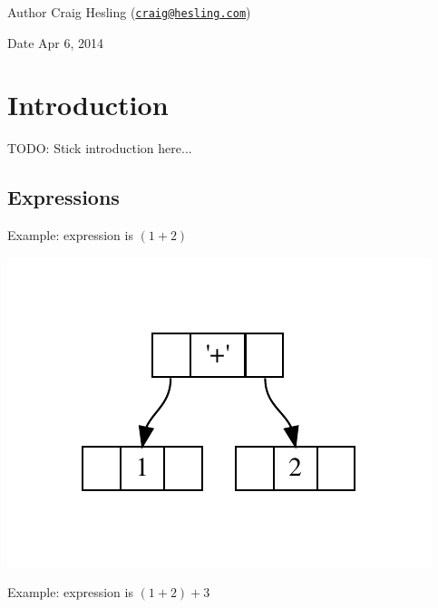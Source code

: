 \begin{DoxyAuthor}{Author}
Craig Hesling (\href{mailto:craig@hesling.com}{\tt craig@hesling.\+com}) 
\end{DoxyAuthor}
\begin{DoxyDate}{Date}
Apr 6, 2014
\end{DoxyDate}
\hypertarget{index_intro_sec}{}\section{Introduction}\label{index_intro_sec}
T\+O\+DO\+: Stick introduction here... \hypertarget{index_expressions}{}\subsection{Expressions}\label{index_expressions}
Example\+: expression is $(1 + 2)$


\begin{DoxyImageNoCaption}
  \mbox{\includegraphics[width=\textwidth,height=\textheight/2,keepaspectratio=true]{dot_inline_dotgraph_2}}
\end{DoxyImageNoCaption}


Example\+: expression is $(1 + 2) + 3$


